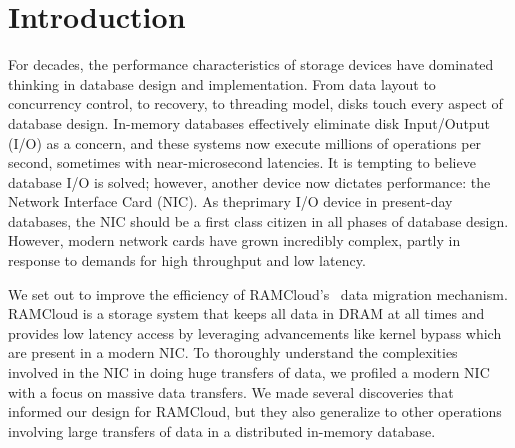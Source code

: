 
\chapter{Introduction}
\label{chap:intro}
For decades, the performance characteristics of storage devices have dominated \linebreak
 thinking in database design and implementation. From data layout to
concurrency \linebreak control, to recovery, to threading model, disks touch every aspect
of database design. \linebreak In-memory databases effectively eliminate disk Input/Output (I/O) as a
concern, and these systems now execute millions of operations per second,
sometimes with \linebreak near-microsecond latencies.  It is tempting to believe 
database I/O is solved; however, \linebreak another device now dictates
performance: the Network Interface Card (NIC). As the\linebreak primary I/O device in present-day databases,
the NIC should be a first class citizen in all phases of database design.
However, modern network cards have grown incredibly complex, partly in response
to demands for high throughput and low latency.

We set out to improve the efficiency of RAMCloud's~\cite{ramcloud} data migration mechanism. 
RAMCloud is a storage system that keeps all data in DRAM at all times and provides low latency access by
leveraging advancements like kernel bypass which are present in a \linebreak modern NIC.
To thoroughly understand the complexities involved in the NIC in doing huge
transfers of data, we profiled a modern NIC with a focus on massive data \linebreak transfers.
 We made several discoveries that informed our design for RAMCloud,
 but they also generalize to other operations involving large transfers of data in a distributed in-memory database. 

